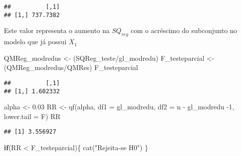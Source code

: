\documentclass[
]{article}
\newenvironment{Shaded}{\begin{snugshade}}{\end{snugshade}}
\newcommand{\AttributeTok}[1]{\textcolor[rgb]{0.77,0.63,0.00}{#1}}
\newcommand{\ControlFlowTok}[1]{\textcolor[rgb]{0.13,0.29,0.53}{\textbf{#1}}}
\newcommand{\DecValTok}[1]{\textcolor[rgb]{0.00,0.00,0.81}{#1}}
\newcommand{\FloatTok}[1]{\textcolor[rgb]{0.00,0.00,0.81}{#1}}
\newcommand{\FunctionTok}[1]{\textcolor[rgb]{0.00,0.00,0.00}{#1}}
\newcommand{\NormalTok}[1]{#1}
\newcommand{\OtherTok}[1]{\textcolor[rgb]{0.56,0.35,0.01}{#1}}
\newcommand{\SpecialCharTok}[1]{\textcolor[rgb]{0.00,0.00,0.00}{#1}}
\newcommand{\StringTok}[1]{\textcolor[rgb]{0.31,0.60,0.02}{#1}}
\begin{document}
\begin{verbatim}
##          [,1]
## [1,] 737.7382
\end{verbatim}

Este valor representa o aumento na \(SQ_{reg}\) com o acréscimo do
subconjunto no modelo que já possui \(X_1\)

\begin{Shaded}
\begin{Highlighting}[]
\NormalTok{QMReg\_modredus }\OtherTok{\textless{}{-}}\NormalTok{ (SQReg\_teste}\SpecialCharTok{/}\NormalTok{gl\_modredu)}
\NormalTok{F\_testeparcial }\OtherTok{\textless{}{-}}\NormalTok{ (QMReg\_modredus}\SpecialCharTok{/}\NormalTok{QMRes)}
\NormalTok{F\_testeparcial}
\end{Highlighting}
\end{Shaded}

\begin{verbatim}
##          [,1]
## [1,] 1.602332
\end{verbatim}

\begin{Shaded}
\begin{Highlighting}[]
\NormalTok{alpha }\OtherTok{\textless{}{-}} \FloatTok{0.03}
\NormalTok{RR }\OtherTok{\textless{}{-}} \FunctionTok{qf}\NormalTok{(alpha, }\AttributeTok{df1 =}\NormalTok{ gl\_modredu, }\AttributeTok{df2 =}\NormalTok{ n }\SpecialCharTok{{-}}\NormalTok{ gl\_modredu }\SpecialCharTok{{-}}\DecValTok{1}\NormalTok{, }\AttributeTok{lower.tail =}\NormalTok{ F)}
\NormalTok{RR}
\end{Highlighting}
\end{Shaded}

\begin{verbatim}
## [1] 3.556927
\end{verbatim}

\begin{Shaded}
\begin{Highlighting}[]
\ControlFlowTok{if}\NormalTok{(RR }\SpecialCharTok{\textless{}}\NormalTok{ F\_testeparcial)\{}
 \FunctionTok{cat}\NormalTok{(}\StringTok{"Rejeita{-}se H0"}\NormalTok{)}
\NormalTok{\}}
\end{Highlighting}
\end{Shaded}
\end{document}
